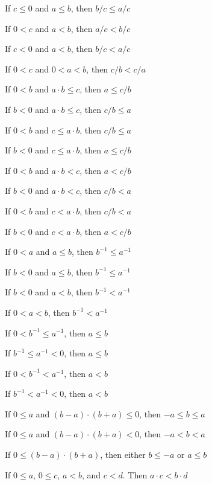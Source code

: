 \documentclass{article}
\let\xrbreak\medbreak
\begin{document}
\begin{thm}
\item\label{xreal1:73} If $c\leq0$ and $a\leq b$, then $b/c\leq a/c$
\item\label{xreal1:74} If $0<c$ and $a<b$, then $a/c<b/c$
\item\label{xreal1:75} If $c<0$ and $a<b$, then $b/c<a/c$
\item\label{xreal1:76} If $0<c$ and $0<a<b$, then $c/b<c/a$
  \xrbreak
\item\label{xreal1:77} If $0<b$ and $a\cdot b\leq c$,
  then $a\leq c/b$
\item\label{xreal1:78} If $b<0$ and $a\cdot b\leq c$, then $c/b\leq a$
\item\label{xreal1:79} If $0<b$ and $c\leq a\cdot b$, then $c/b\leq a$
\item\label{xreal1:80} If $b<0$ and $c\leq a\cdot b$, then $a\leq c/b$
\item\label{xreal1:81} If $0<b$ and $a\cdot b<c$, then $a<c/b$
\item\label{xreal1:82} If $b<0$ and $a\cdot b<c$, then $c/b<a$
\item\label{xreal1:83} If $0<b$ and $c<a\cdot b$, then $c/b<a$
\item\label{xreal1:84} If $b<0$ and $c<a\cdot b$, then $a<c/b$
  \xrbreak
\item\label{xreal1:85} If $0<a$ and $a\leq b$, then  $b^{-1}\leq a^{-1}$
\item\label{xreal1:86} If $b<0$ and $a\leq b$, then $b^{-1}\leq a^{-1}$
\item\label{xreal1:87} If $b<0$ and $a<b$, then $b^{-1}<a^{-1}$
\item\label{xreal1:88} If $0<a<b$, then $b^{-1}<a^{-1}$
\item\label{xreal1:89} If $0<b^{-1}\leq a^{-1}$, then $a\leq b$
\item\label{xreal1:90} If $b^{-1}\leq a^{-1}<0$, then $a\leq b$
\item\label{xreal1:91} If $0<b^{-1}<a^{-1}$, then $a<b$
\item\label{xreal1:92} If $b^{-1}<a^{-1}<0$, then $a<b$
  \xrbreak
\item\label{xreal1:93} If $0\leq a$ and $(b-a)\cdot(b+a)\leq0$,
  then $-a\leq b\leq a$
\item\label{xreal1:94} If $0\leq a$ and $(b-a)\cdot(b+a)<0$, then $-a<b<a$
\item\label{xreal1:95} If $0\leq(b-a)\cdot(b+a)$, then either $b\leq-a$
  or $a\leq b$
\item\label{xreal1:96} If $0\leq a$, $0\leq c$, $a<b$, and $c<d$.
  Then $a\cdot c<b\cdot d$

\end{thm}
\end{document}
